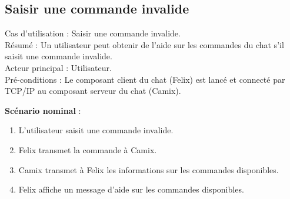 \subsection{Saisir une commande invalide}
\label{sec:cu:cmdinvalide}

\noindent
Cas d'utilisation : Saisir une commande invalide.\\
Résumé : Un utilisateur peut obtenir de l'aide sur les commandes du chat s'il saisit une commande invalide. \\
Acteur principal : Utilisateur.\\
Pré-conditions : Le composant client du chat (Felix) est lancé et connecté par TCP/IP au composant serveur du chat (Camix).

\newpage
\textbf{Scénario nominal} :
\begin{enumerate}
\item L'utilisateur saisit une commande invalide.
\item Felix transmet la commande à Camix.
\item Camix transmet à Felix les informations sur les commandes disponibles.
\item Felix affiche un message d'aide sur les commandes disponibles.
\end{enumerate}

